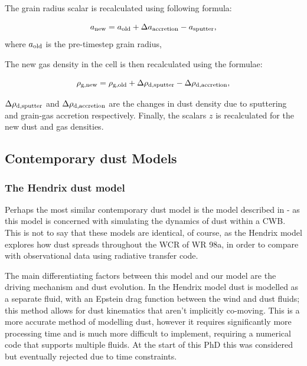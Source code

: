 The grain radius scalar is recalculated using following formula:

\begin{equation}
  a_\text{new} = a_\text{old} + \Delta a_\text{accretion} - a_\text{sputter},
\end{equation}
where $a_\text{old}$ is the pre-timestep grain radius, 



The new gas density in the cell is then recalculated using the formulae:

\begin{equation}
  \rho_\text{g,new} = \rho_\text{g,old} + \Delta\rho_\text{d,sputter} - \Delta\rho_\text{d,accretion},
\end{equation}

\noindent
$\Delta\rho_\text{d,sputter}$ and $\Delta\rho_\text{d,accretion}$ are the changes in dust density due to sputtering and grain-gas accretion respectively.
Finally, the scalars $z$ is recalculated for the new dust and gas densities.


\subsection{Contemporary dust Models}



\subsubsection{The Hendrix dust model}

Perhaps the most similar contemporary dust model is the model described in \textcite{hendrix_pinwheels_2016} - as this model is concerned with simulating the dynamics of dust within a CWB.
This is not to say that these models are identical, of course, as the Hendrix model explores how dust spreads throughout the WCR of WR 98a, in order to compare with observational data using radiative transfer code.


The main differentiating factors between this model and our model are the driving mechanism and dust evolution.
In the Hendrix model dust is modelled as a separate fluid, with an Epstein drag function between the wind and dust fluids; this method allows for dust kinematics that aren't implicitly co-moving.
This is a more accurate method of modelling dust, however it requires significantly more processing time and is much more difficult to implement, requiring a numerical code that supports multiple fluids.
At the start of this PhD this was considered but eventually rejected due to time constraints.

